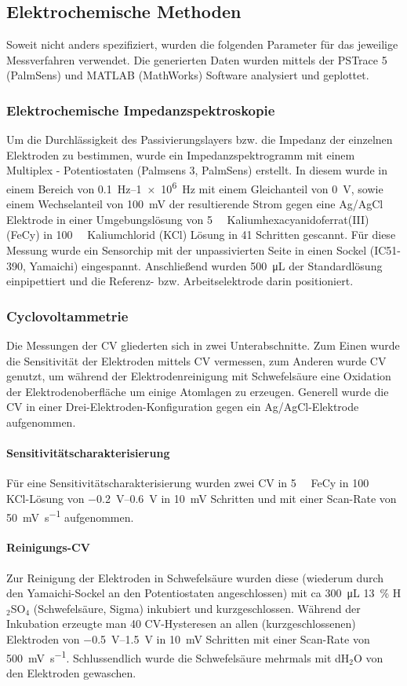 \subsection{Elektrochemische Methoden}
Soweit nicht anders spezifiziert, wurden die folgenden Parameter für das jeweilige Messverfahren verwendet. Die generierten Daten wurden mittels der PSTrace 5 (PalmSens) und MATLAB (MathWorks) Software analysiert und geplottet.
\subsubsection{Elektrochemische Impedanzspektroskopie}
Um die Durchlässigkeit des Passivierungslayers bzw. die Impedanz der einzelnen Elektroden zu bestimmen, wurde ein Impedanzspektrogramm mit einem Multiplex - Potentiostaten (Palmsens 3, PalmSens) erstellt. In diesem wurde in einem Bereich von \SIrange{0.1}{1e6}{Hz} mit einem Gleichanteil von \SI{0}{\volt}, sowie einem Wechselanteil von \SI{100}{\milli \volt} der resultierende Strom gegen eine Ag/AgCl Elektrode in einer Umgebungslösung von \SI{5}{\milli\Molar} Kaliumhexacyanidoferrat(III) (FeCy) in \SI{100}{\milli\Molar} Kaliumchlorid (KCl) Lösung in 41 Schritten gescannt. Für diese Messung wurde ein Sensorchip mit der unpassivierten Seite in einen Sockel (IC51-390, Yamaichi) eingespannt. Anschließend wurden \SI{500}{\micro\liter} der Standardlösung einpipettiert und die Referenz- bzw. Arbeitselektrode darin positioniert.

\subsubsection{Cyclovoltammetrie}
Die Messungen der CV gliederten sich in zwei Unterabschnitte. Zum Einen wurde die Sensitivität der Elektroden mittels CV vermessen, zum Anderen wurde CV genutzt, um während der Elektrodenreinigung mit Schwefelsäure eine Oxidation der Elektrodenoberfläche um einige Atomlagen zu erzeugen. Generell wurde die CV in einer Drei-Elektroden-Konfiguration gegen ein Ag/AgCl-Elektrode aufgenommen.
\paragraph{Sensitivitätscharakterisierung}
Für eine Sensitivitätscharakterisierung wurden zwei CV in \SI{5}{\milli\Molar} FeCy in \SI{100}{\milli\Molar} KCl-Lösung von \SIrange{-0.2}{0.6}{\volt} in \SI{10}{\milli\volt} Schritten und mit einer Scan-Rate von \SI{50}{\milli\volt\per\second} aufgenommen.
\paragraph{Reinigungs-CV}
Zur Reinigung der Elektroden in Schwefelsäure wurden diese (wiederum durch den Yamaichi-Sockel an den Potentiostaten angeschlossen) mit ca \SI{300}{\micro\liter} \SI{13}{\percent} H$_2$SO$_4$ (Schwefelsäure, Sigma) inkubiert und kurzgeschlossen. Während der Inkubation erzeugte man 40 CV-Hysteresen an allen (kurzgeschlossenen) Elektroden von \SIrange{-0.5}{1.5}{\volt} in \SI{10}{\milli\volt} Schritten mit einer Scan-Rate von \SI{500}{\milli\volt\per\second}. Schlussendlich wurde die Schwefelsäure mehrmals mit dH$_2$O von den Elektroden gewaschen.